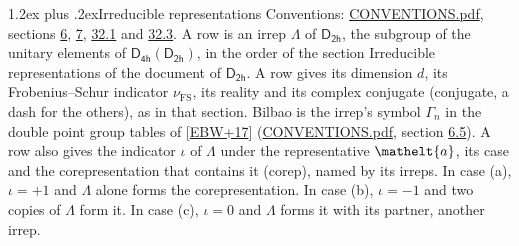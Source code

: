 \documentclass[10pt,a4paper]{article}
\makeatletter
\renewcommand\section{\@startsection{section}{1}{\z@}{-3ex plus -1ex minus -.2ex}%
  {1.2ex plus .2ex}{\normalfont\large\sffamily\bfseries\color{parttitle}}}
\numberwithin{equation}{section}
\newcommand{\eltfont}[1]{{\let\sigma\eltsigma\mathelt{#1}}}
\newcommand{\grp}[1]{\mathsf{#1}}
\newcommand{\elt}[1]{\eltfont{#1}}
\newcommand{\fsind}{\nu_{\mathrm{FS}}}
\makeatother
\begin{document}
\section{Irreducible representations}\label{s:irreps}
Conventions: \href{../../CONVENTIONS.pdf}{CONVENTIONS.pdf}, sections \href{../../../rotation/CONVENTIONS.pdf\#conv.6}{6}, \href{../../../rotation/CONVENTIONS.pdf\#conv.7}{7}, \href{../../CONVENTIONS.pdf\#conv.32.1}{32.1} and \href{../../CONVENTIONS.pdf\#conv.32.3}{32.3}.
\leavevmode\label{n:irrep.Delta}A row is an irrep $\Lambda$ of $\grp{D_{2h}}$, the subgroup of the unitary elements of $\grp{D_{4h}}(\grp{D_{2h}})$, in the order of the section Irreducible representations of the document of \href{../../../rotation/data/pdf/D2h.pdf}{$\grp{D_{2h}}$}. \label{n:index.dimension}\label{n:index.frobenius}\label{n:head.irrep}\label{n:head.reality}\label{n:head.conjugate}A row gives its dimension $d$, its Frobenius--Schur indicator $\fsind$, its reality and its complex conjugate (conjugate, a dash for the others), as in that section. \label{n:head.bilbao}\label{n:irrep.alias.gamma}Bilbao is the irrep's symbol $\Gamma_n$ in the double point group tables of [\href{../../../REFERENCES.pdf\#ref.EBW+17}{EBW+17}] (\href{../../CONVENTIONS.pdf}{CONVENTIONS.pdf}, section \href{../../../rotation/CONVENTIONS.pdf\#conv.6.5}{6.5}). \label{n:head.case.corep}\label{n:head.corep}A row also gives the indicator $\iota$ of $\Lambda$ under the representative $\elt{a}$, its case and the corepresentation that contains it (corep), named by its irreps. In case (a), $\iota = +1$ and $\Lambda$ alone forms the corepresentation. In case (b), $\iota = -1$ and two copies of $\Lambda$ form it. In case (c), $\iota = 0$ and $\Lambda$ forms it with its partner, another irrep.
\setlength{\emergencystretch}{2em}\par\setlength{\emergencystretch}{0pt}
\end{document}
